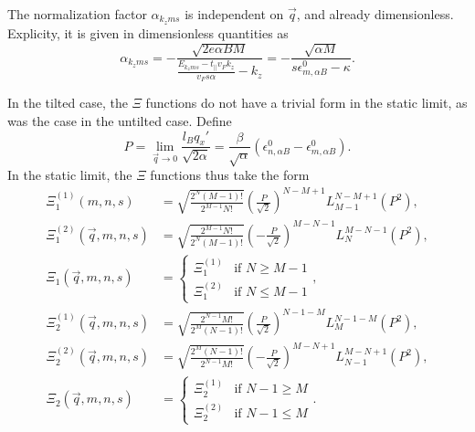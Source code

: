The normalization factor \( \alpha _{k_z m s} \) is independent on \( \vec{q} \), and already dimensionless.
Explicity, it is given in dimensionless quantities as
\begin{equation}
  \alpha _{k_z m s} =
  -\frac{\sqrt{2 e \alpha B M}}{ \frac{E_{k_{z} m s} - t_{\parallel} v_F k_z}{v_{F} s \alpha } - k_z}
  = -\frac{\sqrt{\alpha M}}{s \epsilon ^{0}_{m, \alpha B} - \kappa }.
\end{equation}

In the tilted case, the \( \Xi \) functions do not have a trivial form in the static limit, as was the case in the untilted case.
Define
\[
P = \lim_{\vec{q} \to 0} \frac{l_B q_x'}{\sqrt{2 \alpha } } = \frac{\beta}{\sqrt{\alpha}} (\epsilon^0_{n, \alpha B} - \epsilon^0_{m, \alpha B}).
\]
In the static limit, the \( \Xi \) functions thus take the form
\begin{align}
  \Xi_1 ^{(1)}(m, n, s) &= \sqrt{\frac{2^N (M-1)!}{2^{M-1} N!}}
                                   \left( \frac{P}{\sqrt{2}} \right)^{N-M + 1}
                                   L^{N-M+1}_{M-1} \left( P^2 \right),\\
  \Xi_1 ^{(2)}(\vec{q}, m, n, s) &= \sqrt{\frac{2^{M-1} N!}{2^N (M-1)!}}
                                   \left( -\frac{P}{\sqrt{2}} \right)^{M-N - 1}
                                   L^{M - N - 1}_N \left( P^2 \right),\\
  \Xi_1(\vec{q}, m, n, s) &=
          \begin{cases}
            \Xi _1 ^{(1)} & \text{if } N \geq M-1\\
            \Xi _1 ^{(2)} & \text{if } N \leq M-1
          \end{cases},
\end{align}
\begin{align}
  \Xi_2 ^{(1)}(\vec{q}, m, n, s) &= \sqrt{\frac{2^{N-1} M!}{2^M (N-1)!}}
                                   \left( \frac{P}{\sqrt{2}} \right)^{N-1 - M}
                                   L^{N-1 -M}_{M} \left( P^2 \right),\\
  \Xi_2 ^{(2)}(\vec{q}, m, n, s) &= \sqrt{\frac{2^M (N-1)!}{2^{N-1} M!}}
                                   \left( -\frac{P}{\sqrt{2}} \right)^{M-N + 1}
                                   L^{M - N + 1}_{N-1} \left( P^2 \right),\\
  \Xi_2(\vec{q}, m, n, s) &=
          \begin{cases}
            \Xi _2 ^{(1)} & \text{if } N-1 \geq M\\
            \Xi _2 ^{(2)} & \text{if } N-1 \leq M
          \end{cases}.
\end{align}

